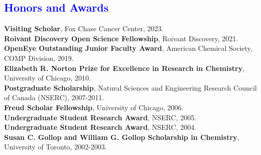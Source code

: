 \documentclass[margin,line]{res}
\begin{document}
\begin{resume}


\section{\sc \textcolor{blue}{ Honors and Awards} }
{\bf Visiting Scholar}, Fox Chase Cancer Center, 2023. \\
{\bf Roivant Discovery Open Science Fellowship}, Roivant Discovery, 2021. \\
{\bf OpenEye Outstanding Junior Faculty Award}, American Chemical Society, COMP Division, 2019. \\
{\bf Elizabeth R. Norton Prize for Excellence in Research in Chemistry}, University of Chicago, 2010. \\
{\bf Postgraduate Scholarship}, Natural Sciences and Engineering Research Council of Canada (NSERC), 2007-2011.\\
{\bf Freud Scholar Fellowship}, University of Chicago, 2006. \\
{\bf Undergraduate Student Research Award}, NSERC, 2005. \\
{\bf Undergraduate Student Research Award}, NSERC, 2004. \\
{\bf Susan C. Gollop and William G. Gollop Scholarship in Chemistry}, University of Toronto, 2002-2003. \\


\end{resume}
\end{document}
